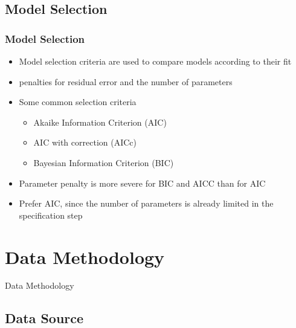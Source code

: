 \documentclass[presentation]{beamer}
\begin{document}
\subsection{Model Selection}

\begin{frame}[t]
\frametitle{Model Selection}
\begin{itemize}
\item{Model selection criteria are used to compare models according to their fit}
\item{penalties for residual error and the number of parameters}
\item{Some common selection criteria
  \begin{itemize}
  \item{Akaike Information Criterion (AIC)}
  \item{AIC with correction (AICc)}
  \item{Bayesian Information Criterion (BIC)}
  \end{itemize}
}
\item{Parameter penalty is more severe for BIC and AICC than for AIC \cite{bisgaard2011time}}
\item{Prefer AIC, since the number of parameters is already limited in the specification step}
\end{itemize}
\end{frame}

\section{Data Methodology}

\begin{frame}
\begin{center}
\Large{Data Methodology}
\end{center}
\end{frame}


\subsection{Data Source}
\end{document}
